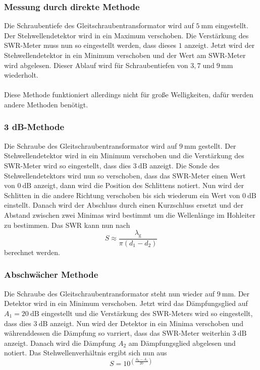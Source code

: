 \subsubsection{Messung durch direkte Methode}
Die Schraubentiefe des Gleitschraubentransformator wird auf $\SI{5}{\milli\meter}$ eingestellt.
Der Stehwellendetektor wird in ein Maximum verschoben.
Die Verstärkung des SWR-Meter muss nun so eingestellt werden, dass dieses $1$ anzeigt.
Jetzt wird der Stehwellendetektor in ein Minimum verschoben und der Wert am SWR-Meter wird abgelesen.
Dieser Ablauf wird für Schraubentiefen von $3,7 \; \text{und} \; 9 \, \si{\milli\meter}$ wiederholt.
\\\\
Diese Methode funktioniert allerdings nicht für große Welligkeiten, dafür werden andere Methoden benötigt.
\subsubsection{3 dB-Methode}
Die Schraube des Gleitschraubentransformator wird auf $\SI{9}{\milli\meter}$ gestellt.
Der Stehwellendetektor wird in ein Minimum verschoben und die Verstärkung des SWR-Meter wird so eingestellt, dass dies $\SI{3}{\dB}$ anzeigt.
Die Sonde des Stehwellendetektors wird nun so verschoben, dass das SWR-Meter einen Wert von $\SI{0}{\dB}$ anzeigt, dann wird die Position des Schlittens notiert.
Nun wird der Schlitten in die andere Richtung verschoben bis sich wiederum ein Wert von $\SI{0}{\dB}$ einstellt.
Danach wird der Abschluss durch einen Kurzschluss ersetzt und der Abstand zwischen zwei Minimas wird bestimmt um die Wellenlänge im Hohleiter zu bestimmen.
Das SWR kann nun nach 
\begin{equation}
    S \approx \frac{\lambda _\text{g}}{\pi \left ( d_1 - d_2 \right )}
    \label{eq:3db_SWR}
\end{equation}
berechnet werden.

\subsubsection{Abschwächer Methode}
\label{sec:abschwaecher_methode}
Die Schraube des Gleitschraubentransformator steht nun wieder auf $\SI{9}{\milli \meter}$.
Der Detektor wird in ein Minimum verschoben.
Jetzt wird das Dämpfungsglied auf $A_1 = \SI{20}{\dB}$ eingestellt und die Verstärkung des SWR-Meters wird so eingestellt, dass dies $\SI{3}{\dB}$ anzeigt.
Nun wird der Detektor in ein Minima verschoben und währenddessen die Dämpfung so varriert, dass das SWR-Meter weiterhin $\SI{3}{\dB}$ anzeigt.
Danach wird die Dämpfung $A_2$ am Dämpfungsglied abgelesen und notiert.
Das Stehwellenverhältnis ergibt sich nun aus 
\begin{equation}
    S = 10^{\left (\frac{A_2 -A_1}{20} \right )}
    \label{eq:daempfung_SWR}
\end{equation}